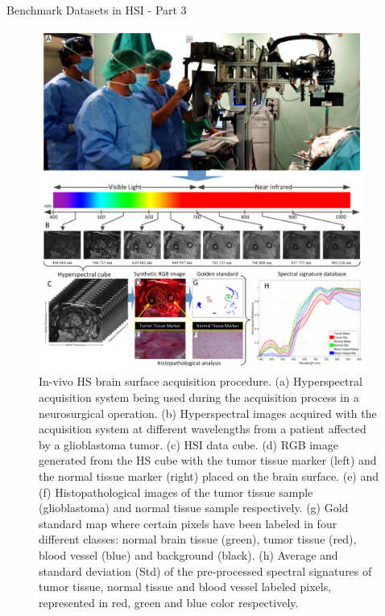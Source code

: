 \documentclass[10pt,svgnames,fragile]{beamer}
\begin{document}
\begin{frame}{Benchmark Datasets in HSI - Part 3}
\small
\begin{figure}
    \centering
    \begin{columns}[T] %
        \begin{column}{0.38\textwidth}
            \centering
            \includegraphics[width=0.8\linewidth]{In-Vivo.png}
        \end{column}
        \begin{column}{0.62\textwidth}
            \caption{In-vivo HS brain surface acquisition procedure. (a) Hyperspectral acquisition system being used during the acquisition process in a neurosurgical operation. (b) Hyperspectral images acquired with the acquisition system at different wavelengths from a patient affected by a glioblastoma tumor. (c) HSI data cube. (d) RGB image generated from the HS cube with the tumor tissue marker (left) and the normal tissue marker (right) placed on the brain surface. (e) and (f) Histopathological images of the tumor tissue sample (glioblastoma) and normal tissue sample respectively. (g) Gold standard map where certain pixels have been labeled in four different classes: normal brain tissue (green), tumor tissue (red), blood vessel (blue) and background (black). (h) Average and standard deviation (Std) of the pre-processed spectral signatures of tumor tissue, normal tissue and blood vessel labeled pixels, represented in red, green and blue color respectively.\cite{fabeloInVivoHyperspectralHuman2019}}

\end{column}
\end{columns}
\end{figure}
\end{frame}
\end{document}
